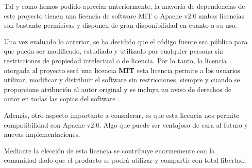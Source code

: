Tal y como hemos podido apreciar anteriormente, la mayoría de dependencias de este proyecto tienen una licencia de software MIT o Apache v2.0 ambas licencias son bastante permisivas y disponen de gran disponibilidad en cuanto a su uso.

Una vez evaluado lo anterior, se ha decidido que el código fuente sea público para que pueda ser modificado, estudiado y utilizado por cualquier persona sin restricciones de propiedad intelectual o de licencia. Por lo tanto, la licencia otorgada al proyecto será una licencia \textbf{MIT} esta licencia permite a los usuarios utilizar, modificar y distribuir el software sin restricciones, siempre y cuando se proporcione atribución al autor original y se incluya un aviso de derechos de autor en todas las copias del software \cite{licenciamit:latex}.

Además, otro aspecto importante a considerar, es que esta licencia nos permite compatibilidad con Apache v2.0. Algo que puede ser ventajoso de cara al futuro y nuevas implementaciones.

Mediante la elección de esta licencia se contribuye enormemente con la comunidad dado que el producto se podrá utilizar y compartir con total libertad.


